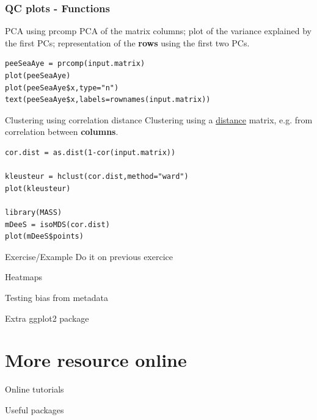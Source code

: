 \documentclass[10pt]{beamer}
\newenvironment{xframe}[2][]
  {\begin{frame}[fragile,environment=xframe,#1]
  \frametitle{#2}}
  {\end{frame}}
\begin{document}
\begin{xframe}[shrink=10]{QC plots - Functions}
  \begin{block}{PCA using {\sf prcomp}}
    PCA of the matrix columns; plot of the variance explained by the first PCs; representation of the {\bf rows} using the first two PCs.
\begin{verbatim}
peeSeaAye = prcomp(input.matrix)
plot(peeSeaAye)
plot(peeSeaAye$x,type="n")
text(peeSeaAye$x,labels=rownames(input.matrix))
\end{verbatim}  
  \end{block}
  \begin{block}{Clustering using correlation distance}
    Clustering using a \uline{distance} matrix, e.g. from correlation between {\bf columns}.
\begin{verbatim}
cor.dist = as.dist(1-cor(input.matrix))

kleusteur = hclust(cor.dist,method="ward")
plot(kleusteur)

library(MASS)
mDeeS = isoMDS(cor.dist)
plot(mDeeS$points)
\end{verbatim}  
  \end{block}
\end{xframe}

\begin{frame}{Exercise/Example}
  Do it on previous exercice
\end{frame}

\begin{frame}{Heatmaps}
  
\end{frame}

\begin{frame}{Testing bias from metadata}
  
\end{frame}

\begin{frame}{Extra ggplot2 package}
  
\end{frame}

\section{More resource online}

\begin{frame}{Online tutorials}
  
\end{frame}

\begin{frame}{Useful packages}
  
\end{frame}
\end{document}
